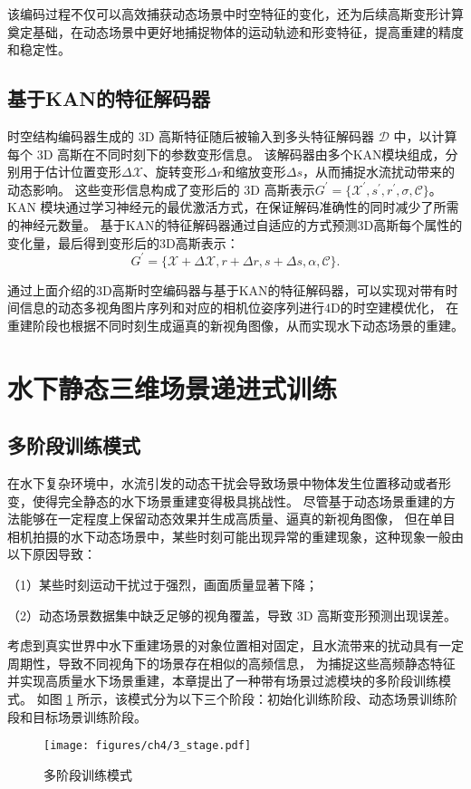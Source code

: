 该编码过程不仅可以高效捕获动态场景中时空特征的变化，还为后续高斯变形计算奠定基础，在动态场景中更好地捕捉物体的运动轨迹和形变特征，提高重建的精度和稳定性。

\subsection{基于KAN的特征解码器}
时空结构编码器生成的 3D 高斯特征随后被输入到多头特征解码器 $\mathcal{D}$ 中，以计算每个 3D 高斯在不同时刻下的参数变形信息。
该解码器由多个KAN模块组成，分别用于估计位置变形$\Delta \mathcal{X}$、旋转变形$\Delta r$和缩放变形$\Delta s$，从而捕捉水流扰动带来的动态影响。
这些变形信息构成了变形后的 3D 高斯表示$G^\prime=\{\mathcal{X}^\prime, s^\prime, r^\prime, \sigma, \mathcal{C} \}$。
KAN 模块通过学习神经元的最优激活方式，在保证解码准确性的同时减少了所需的神经元数量。
基于KAN的特征解码器通过自适应的方式预测3D高斯每个属性的变化量，最后得到变形后的3D高斯表示：
\begin{equation}
    G^\prime = \{ \mathcal{X} + \Delta \mathcal{X}, r + \Delta r, s + \Delta s, \alpha,\mathcal{C} \}.
\end{equation}

通过上面介绍的3D高斯时空编码器与基于KAN的特征解码器，可以实现对带有时间信息的动态多视角图片序列和对应的相机位姿序列进行4D的时空建模优化，
在重建阶段也根据不同时刻生成逼真的新视角图像，从而实现水下动态场景的重建。

\section{水下静态三维场景递进式训练}
\subsection{多阶段训练模式}
在水下复杂环境中，水流引发的动态干扰会导致场景中物体发生位置移动或者形变，使得完全静态的水下场景重建变得极具挑战性。
尽管基于动态场景重建的方法能够在一定程度上保留动态效果并生成高质量、逼真的新视角图像，
但在单目相机拍摄的水下动态场景中，某些时刻可能出现异常的重建现象，这种现象一般由以下原因导致：

（1）某些时刻运动干扰过于强烈，画面质量显著下降；

（2）动态场景数据集中缺乏足够的视角覆盖，导致 3D 高斯变形预测出现误差。

考虑到真实世界中水下重建场景的对象位置相对固定，且水流带来的扰动具有一定周期性，导致不同视角下的场景存在相似的高频信息，
为捕捉这些高频静态特征并实现高质量水下场景重建，本章提出了一种带有场景过滤模块的多阶段训练模式。
如图 \ref{img:3_stage} 所示，该模式分为以下三个阶段：初始化训练阶段、动态场景训练阶段和目标场景训练阶段。
\begin{figure}[htbp]
    \centering
    \texttt{[image: figures/ch4/3\_stage.pdf]}
    \caption{多阶段训练模式}
    \label{img:3_stage}
\end{figure}

